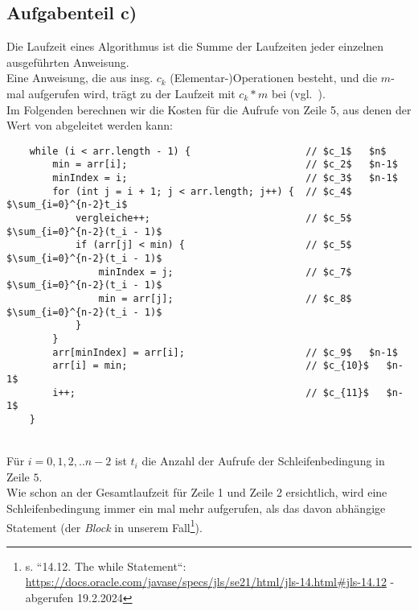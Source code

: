 \subsection{Aufgabenteil c)}

Die Laufzeit eines Algorithmus ist die Summe der Laufzeiten jeder einzelnen ausgeführten Anweisung.\\
Eine Anweisung, die aus insg. $c_k$ (Elementar-)Operationen besteht, und die $m$-mal aufgerufen wird, trägt zu der Laufzeit mit $c_k * m$ bei (vgl.~\cite[29 f.]{CL22}).\\

\noindent
Im Folgenden berechnen wir die Kosten für die Aufrufe von Zeile 5, aus denen der Wert von  abgeleitet werden kann:

\begin{verbatim}
    while (i < arr.length - 1) {                    // $c_1$   $n$
        min = arr[i];                               // $c_2$   $n-1$
        minIndex = i;                               // $c_3$   $n-1$
        for (int j = i + 1; j < arr.length; j++) {  // $c_4$   $\sum_{i=0}^{n-2}t_i$
            vergleiche++;                           // $c_5$   $\sum_{i=0}^{n-2}(t_i - 1)$
            if (arr[j] < min) {                     // $c_5$   $\sum_{i=0}^{n-2}(t_i - 1)$
                minIndex = j;                       // $c_7$   $\sum_{i=0}^{n-2}(t_i - 1)$
                min = arr[j];                       // $c_8$   $\sum_{i=0}^{n-2}(t_i - 1)$
            }
        }
        arr[minIndex] = arr[i];                     // $c_9$   $n-1$
        arr[i] = min;                               // $c_{10}$   $n-1$
        i++;                                        // $c_{11}$   $n-1$
    }
\end{verbatim}\\

\noindent
Für $i = 0, 1, 2, .. n - 2$ ist $t_i$ die Anzahl der Aufrufe der Schleifenbedingung in Zeile $5$.\\
Wie schon an der Gesamtlaufzeit für Zeile 1 und Zeile 2 ersichtlich, wird eine Schleifenbedingung immer ein mal mehr aufgerufen, als das davon abhängige Statement (der \textit{Block} in unserem Fall\footnote{s. ``14.12. The while Statement``: \url{https://docs.oracle.com/javase/specs/jls/se21/html/jls-14.html#jls-14.12} - abgerufen 19.2.2024
}).\\

